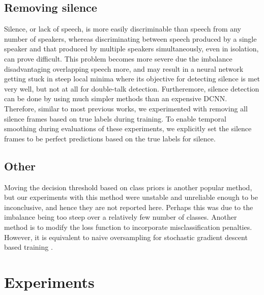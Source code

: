 \documentclass[a4paper]{article}
\begin{document}
\subsection{Removing silence} \label{sec:rm-silence}
Silence, or lack of speech, is more easily discriminable than speech from any number of speakers,
whereas discriminating between speech produced by a single speaker and that produced by multiple speakers simultaneously, even in isolation, can prove difficult.
This problem becomes more severe due the imbalance disadvantaging overlapping speech more,
and may result in a neural network getting stuck in steep local minima where its objective for detecting silence is met very well, but not at all for double-talk detection.
Furtheremore, silence detection can be done by using much simpler methods than an expensive DCNN.
Therefore, similar to most previous works,
we experimented with removing all silence frames based on true labels during training.
To enable temporal smoothing during evaluations of these experiments,
we explicitly set the silence frames to be perfect predictions based on the true labels for silence.

\subsection{Other}
Moving the decision threshold based on class priors is another popular method,
but our experiments with this method were unstable and unreliable enough to be inconclusive,
and hence they are not reported here.
Perhaps this was due to the imbalance being too steep over a relatively few number of classes.
Another method is to modify the loss function to incorporate misclassification penalties.
However, it is equivalent to naive oversampling for stochastic gradient descent based training \cite{Budasystematicstudyclass2017}.

\section{Experiments} \label{sec:eval}
\end{document}
